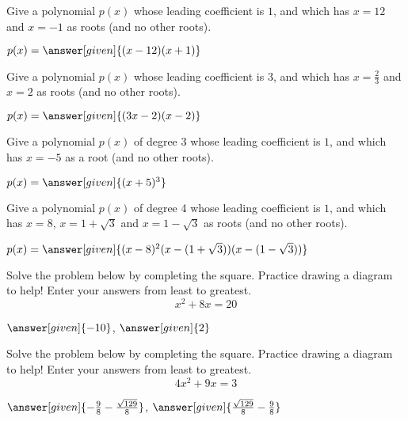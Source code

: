 \documentclass[nooutcomes]{ximera}
\begin{document}
\begin{problem}
Give a polynomial $p(x)$ whose leading coefficient is $1$, and which has $x=12$ and $x=-1$ as roots (and no other roots).

\begin{prompt}
	$p(x) = \answer[given]{(x-12)(x+1)}$
\end{prompt}
\end{problem}


\begin{problem}
Give a polynomial $p(x)$ whose leading coefficient is $3$, and which has $x=\frac{2}{3}$ and $x=2$ as roots (and no other roots).

\begin{prompt}
	$p(x) = \answer[given]{(3x-2)(x-2)}$
\end{prompt}
\end{problem}



\begin{problem}
Give a polynomial $p(x)$ of degree 3 whose leading coefficient is $1$, and which has $x=-5$ as a root (and no other roots).

\begin{prompt}
	$p(x) = \answer[given]{(x+5)^3}$
\end{prompt}
\end{problem}




\begin{problem}
Give a polynomial $p(x)$ of degree 4 whose leading coefficient is $1$, and which has $x=8$, $x=1+\sqrt{3}$ and $x = 1-\sqrt{3}$ as roots (and no other roots).

\begin{prompt}
	$p(x) = \answer[given]{(x-8)^2(x-(1+\sqrt{3}))(x-(1-\sqrt{3}))}$
\end{prompt}
\end{problem}



\begin{problem}
Solve the problem below by completing the square.  Practice drawing a diagram to help! Enter your answers from least to greatest.
\[
x^2 + 8x = 20
\]
\begin{prompt}
	$\answer[given]{-10}$, $\answer[given]{2}$
\end{prompt}
\end{problem}



\begin{problem}
Solve the problem below by completing the square.  Practice drawing a diagram to help! Enter your answers from least to greatest.
\[
4x^2 + 9x = 3
\]
\begin{prompt}
	$\answer[given]{-\frac{9}{8} - \frac{\sqrt{129}}{8}}$, $\answer[given]{\frac{\sqrt{129}}{8} - \frac{9}{8}}$
\end{prompt}
\end{problem}
\end{document}
